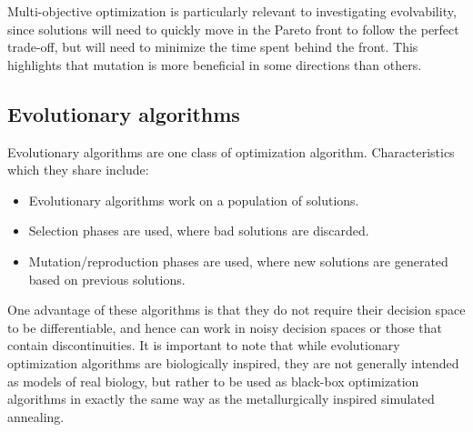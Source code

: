 Multi-objective optimization is particularly relevant to investigating evolvability, since solutions will need to quickly move in the Pareto front to follow the perfect trade-off, but will need to minimize the time spent behind the front. 
This highlights that mutation is more beneficial in some directions than others.

\subsection{Evolutionary algorithms}

Evolutionary algorithms are one class of optimization algorithm. Characteristics which they share include:
\begin{itemize}
\item Evolutionary algorithms work on a population of solutions. 
\item Selection phases are used, where bad solutions are discarded.
\item Mutation/reproduction phases are used, where new solutions are generated based on previous solutions. 
\end{itemize}

One advantage of these algorithms is that they do not require their decision space to be differentiable, and hence can work in noisy decision spaces or those that contain discontinuities. 
It is important to note that while evolutionary optimization algorithms are biologically inspired, they are not generally intended as models of real biology, but rather to be used as black-box optimization algorithms in exactly the same way as the metallurgically inspired simulated annealing.